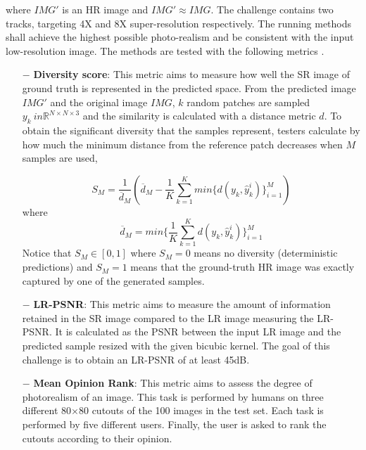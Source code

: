 \documentclass{article}
\begin{document}
\noindent where $IMG'$ is an HR image and $IMG' \approx IMG$. The challenge contains two tracks, targeting 4X and 8X super-resolution respectively. The running methods shall achieve the highest possible photo-realism and be consistent with the input low-resolution image. The methods are tested with the following metrics \cite{ntire21}. %
\begin{itemize}
    \item[$-$] \textbf{Diversity score}: This metric aims to measure how well the SR image of ground truth is represented in the predicted space. From the predicted image $IMG'$ and the original image $IMG$, $k$ random patches are sampled $y_k \ in \mathbb{R}^{N \times N \times 3}$ and the similarity is calculated with a distance metric $d$.  To obtain the significant diversity that the samples represent, testers calculate by how much the minimum distance from the reference patch decreases when $M$ samples are used,

    \begin{equation}
        S_M = \frac{1}{\overline{d}_M}(\overline{d}_M - \frac{1}{K}\sum^K_{k=1} min\{d(y_k, \hat{y}_k^i)\}^M_{i=1})
    \end{equation}
    where 
    \begin{equation}
        \overline{d}_M = min \{\frac{1}{K}\sum^K_{k=1}d(y_k, \hat{y}_k^i)\}^M_{i=1}
    \end{equation}
    Notice that $S_M \in [0,1]$ where $S_M=0$ means no diversity (deterministic predictions) and $S_M=1$ means
    that the ground-truth HR image was exactly captured by one of the generated samples.

    \item[$-$] \textbf{LR-PSNR}: This metric aims to measure the amount of information retained in the SR image compared to the LR image measuring the LR-PSNR. It is calculated as the PSNR between the input LR image and the predicted sample resized with the given bicubic kernel. The goal of this challenge is to obtain an LR-PSNR of at least 45dB.

    \item[$-$] \textbf{Mean Opinion Rank}: This metric aims to assess the degree of photorealism of an image. This task is performed by humans on three different 80$\times$80 cutouts of the 100 images in the test set. Each task is performed by five different users. Finally, the user is asked to rank the cutouts according to their opinion.
\end{itemize}
\end{document}
